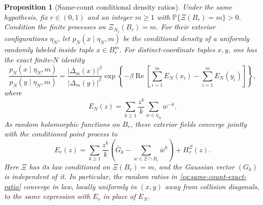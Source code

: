 \documentclass[11pt,a4paper]{article}
\numberwithin{equation}{section}
\newtheorem{proposition}[theorem]{Proposition}
\theoremstyle{definition}
\theoremstyle{remark}
\begin{document}
\begin{proposition}[Same-count conditional density ratios]
\label{prop:inverse-field-conditional-ratios}
Under the same hypothesis, fix $r\in(0,1)$ and an integer $m\geq1$
with $\mathbb P\{\Xi(B_r)=m\}>0$. Condition the finite processes on
$\Xi_{N_j}(B_r)=m$. For their exterior configurations $\eta_N$, let
$p_N(x\mid\eta_N,m)$ be the conditional density of a uniformly randomly
labeled inside tuple $x\in B_r^m$. For distinct-coordinate tuples $x,y$,
one has the exact finite-$N$ identity
\begin{equation}\label{eq:same-count-exact-ratio}
 \frac{p_N(x\mid\eta_N,m)}{p_N(y\mid\eta_N,m)}
 =\frac{|\Delta_m(x)|^\beta}{|\Delta_m(y)|^\beta}
    \exp\left\{-\beta\operatorname{Re}
       \left[\sum_{i=1}^m E_N(x_i)-\sum_{i=1}^m E_N(y_i)\right]\right\},
\end{equation}
where
\[
 E_N(z)=\sum_{k\geq1}\frac{z^k}{k}
                           \sum_{w\in\eta_N}w^{-k}.
\]
As random holomorphic functions on $B_r$, these exterior fields converge
jointly with the conditioned point process to
\begin{equation}\label{eq:augmented-exterior-field}
 E_r(z)=\sum_{k\geq1}\frac{z^k}{k}
       \left(\bar G_k-
        \sum_{w\in\Xi\cap B_r}\bar w^k\right)+H_r^{\Xi}(z).
\end{equation}
Here $\Xi$ has its law conditioned on $\Xi(B_r)=m$, and the Gaussian
vector $(G_k)$ is independent of it. In particular, the random ratios
in \eqref{eq:same-count-exact-ratio} converge in law, locally uniformly
in $(x,y)$ away from collision diagonals, to the same expression with
$E_r$ in place of $E_N$.
\end{proposition}
\end{document}
